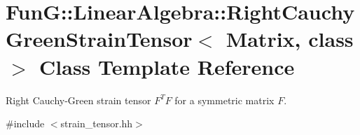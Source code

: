 \hypertarget{classFunG_1_1LinearAlgebra_1_1RightCauchyGreenStrainTensor}{\section{\-Fun\-G\-:\-:\-Linear\-Algebra\-:\-:\-Right\-Cauchy\-Green\-Strain\-Tensor$<$ \-Matrix, class $>$ \-Class \-Template \-Reference}
\label{classFunG_1_1LinearAlgebra_1_1RightCauchyGreenStrainTensor}
}


\-Right \-Cauchy-\/\-Green strain tensor $ F^T F $ for a symmetric matrix $ F $.  




{\ttfamily \#include $<$strain\-\_\-tensor.\-hh$>$}


